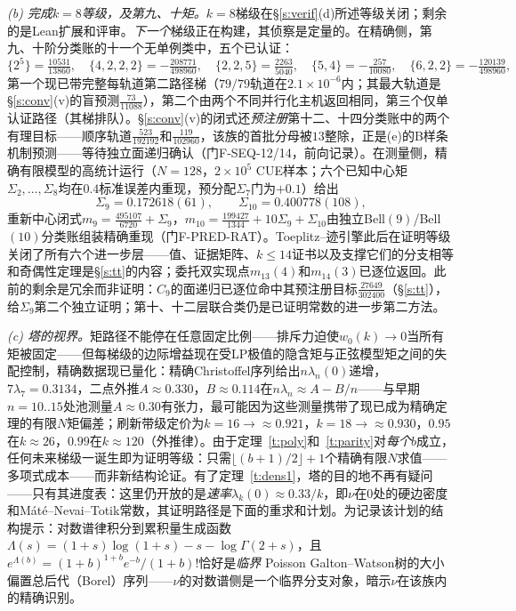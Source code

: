 \documentclass[11pt]{article}
\numberwithin{equation}{section}
\theoremstyle{definition}
\theoremstyle{remark}
\begin{document}
\emph{(b) 完成$k=8$等级，及第九、十矩。}$k=8$梯级在\S\ref{s:verif}(d)所述等级关闭；剩余的是Lean扩展和评审。\emph{下一个}梯级正在构建，其侦察是定量的。在精确侧，第九、十阶分类账的十一个无单例类中，五个已认证：
\[
\{2^5\}=\tfrac{10531}{13860},\quad
\{4,2,2,2\}=-\tfrac{208771}{498960},\quad
\{2,2,5\}=\tfrac{2263}{5040},\quad
\{5,4\}=-\tfrac{257}{10080},\quad
\{6,2,2\}=-\tfrac{120139}{498960},
\]
第一个现已带完整每轨道第二路径梯（$79/79$轨道在$2.1\times10^{-6}$内；其最大轨道是\S\ref{s:conv}(v)的盲预测$\tfrac{73}{11088}$），第二个由两个不同并行化主机返回相同，第三个仅单认证路径（其梯排队）。\S\ref{s:conv}(v)的闭式还\emph{预注册}第十二、十四分类账中的两个有理目标——顺序轨道$\tfrac{523}{192192}$和$\tfrac{119}{102960}$，该族的首批分母被$13$整除，正是(e)的B样条机制预测——等待独立面递归确认（门F-SEQ-12/14，前向记录）。在测量侧，精确有限模型的高统计运行（$N=128$，$2\times10^{5}$ CUE样本；六个已知中心矩$\Sigma_2,\dots,\Sigma_8$均在$0.4$标准误差内重现，预分配$\Sigma_7$门为$+0.1$）给出
\[
\Sigma_9=0.172618(61),\qquad
\Sigma_{10}=0.400778(108),
\]
重新中心闭式$m_9=\tfrac{495107}{6720}+\Sigma_9$，$m_{10}=\tfrac{199427}{1344}+10\Sigma_9+\Sigma_{10}$由独立Bell$(9)$/Bell$(10)$分类账组装精确重现（门F-PRED-RAT）。Toeplitz--迹引擎此后在证明等级关闭了所有六个进一步层——值、证据矩阵、$k\le14$证书以及支撑它们的分支相等和奇偶性定理是\S\ref{s:tt}的内容；委托双实现点$m_{13}(4)$和$m_{14}(3)$已逐位返回。此前的剩余是冗余而非证明：$C_9$的面递归已逐位命中其预注册目标$\tfrac{27649}{302400}$（\S\ref{s:tt}），给$\Sigma_9$第二个独立证明；第十、十二层联合类仍是已证明常数的进一步第二方法。

\emph{(c) 塔的视界。}矩路径不能停在任意固定比例——排斥力迫使$w_0(k)\to0$当所有矩被固定——但每梯级的边际增益现在受LP极值的隐含矩与正弦模型矩之间的失配控制，精确数据现已量化：精确Christoffel序列给出$n\lambda_n(0)$递增，$7\lambda_7=0.3134$，二点外推$A\approx0.330$，$B\approx0.114$在$n\lambda_n\approx A-B/n$——与早期$n=10..15$处池测量$A\approx0.30$有张力，最可能因为这些测量携带了现已成为精确定理的有限$N$矩偏差；刷新带级定价为$k=16\to\approx0.921$，$k=18\to\approx0.930$，$0.95$在$k\approx26$，$0.99$在$k\approx120$（外推律）。由于定理~\ref{t:poly}和~\ref{t:parity}对\emph{每个}$b$成立，任何未来梯级一诞生即为证明等级：只需$\lfloor(b{+}1)/2\rfloor+1$个精确有限$N$求值——多项式成本——而非新结构论证。有了定理~\ref{t:dens1}，塔的目的地不再有疑问——只有其进度表：这里仍开放的是\emph{速率}$\lambda_k(0)\approx0.33/k$，即$\nu$在$0$处的硬边密度和Máté--Nevai--Totik常数，其证明路径是下面的重求和计划。为记录该计划的结构提示：对数谱律积分到累积量生成函数$\Lambda(s)=(1{+}s)\log(1{+}s)-s-\log\Gamma(2{+}s)$，且$e^{\Lambda(b)}=(1{+}b)^{1+b}e^{-b}/(1{+}b)!$恰好是\emph{临界} Poisson Galton--Watson树的大小偏置总后代（Borel）序列——$\nu$的对数谱侧是一个临界分支对象，暗示$\nu$在该族内的精确识别。
\end{document}
